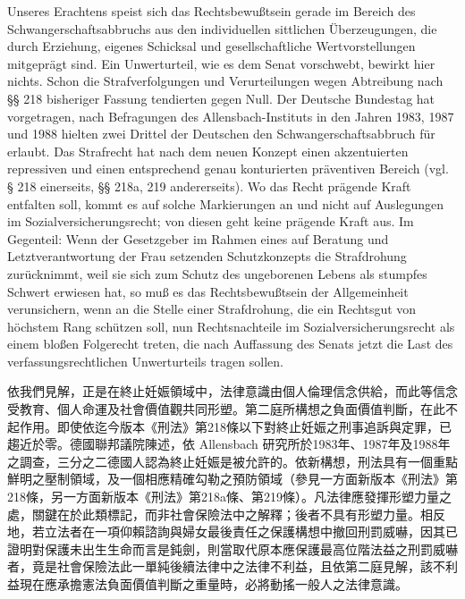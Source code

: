 \documentclass[12pt]{article}
\begin{document}
\begin{sourcepara}[title={原文SondervotumMS.303}]
Unseres Erachtens speist sich das Rechtsbewußtsein gerade im Bereich des Schwangerschaftsabbruchs aus den individuellen sittlichen Überzeugungen, die durch Erziehung, eigenes Schicksal und gesellschaftliche Wertvorstellungen mitgeprägt sind. Ein Unwerturteil, wie es dem Senat vorschwebt, bewirkt hier nichts. Schon die Strafverfolgungen und Verurteilungen wegen Abtreibung nach §§ 218 \abbrFF{} \abbrStGB{} bisheriger Fassung tendierten gegen Null. Der Deutsche Bundestag hat vorgetragen, nach Befragungen des Allensbach-Instituts in den Jahren 1983, 1987 und 1988 hielten zwei Drittel der Deutschen den Schwangerschaftsabbruch für erlaubt. Das Strafrecht hat nach dem neuen Konzept einen akzentuierten repressiven und einen entsprechend genau konturierten präventiven Bereich (vgl. § 218 \abbrStGB{} \abbrNF{} einerseits, §§ 218a, 219 \abbrStGB{} \abbrNF{} andererseits). Wo das Recht prägende Kraft entfalten soll, kommt es auf solche Markierungen an und nicht auf Auslegungen im Sozialversicherungsrecht; von diesen geht keine prägende Kraft aus. Im Gegenteil: Wenn der Gesetzgeber im Rahmen eines auf Beratung und Letztverantwortung der Frau setzenden Schutzkonzepts die Strafdrohung zurücknimmt, weil sie sich zum Schutz des ungeborenen Lebens als stumpfes Schwert erwiesen hat, so muß es das Rechtsbewußtsein der Allgemeinheit verunsichern, wenn an die Stelle einer Strafdrohung, die ein Rechtsgut von höchstem Rang schützen soll, nun Rechtsnachteile im Sozialversicherungsrecht als einem bloßen Folgerecht treten, die nach Auffassung des Senats jetzt die Last des verfassungsrechtlichen Unwerturteils tragen sollen.
\end{sourcepara}
\begin{transpara}
依我們見解，正是在終止妊娠領域中，法律意識由個人倫理信念供給，而此等信念受教育、個人命運及社會價值觀共同形塑。第二庭所構想之負面價值判斷，在此不起作用。即使依迄今版本《刑法》第218條以下對終止妊娠之刑事追訴與定罪，已趨近於零。德國聯邦議院陳述，依 Allensbach 研究所於1983年、1987年及1988年之調查，三分之二德國人認為終止妊娠是被允許的。依新構想，刑法具有一個重點鮮明之壓制領域，及一個相應精確勾勒之預防領域（參見一方面新版本《刑法》第218條，另一方面新版本《刑法》第218a條、第219條）。凡法律應發揮形塑力量之處，關鍵在於此類標記，而非社會保險法中之解釋；後者不具有形塑力量。相反地，若立法者在一項仰賴諮詢與婦女最後責任之保護構想中撤回刑罰威嚇，因其已證明對保護未出生生命而言是鈍劍，則當取代原本應保護最高位階法益之刑罰威嚇者，竟是社會保險法此一單純後續法律中之法律不利益，且依第二庭見解，該不利益現在應承擔憲法負面價值判斷之重量時，必將動搖一般人之法律意識。
\end{transpara}
\end{document}
